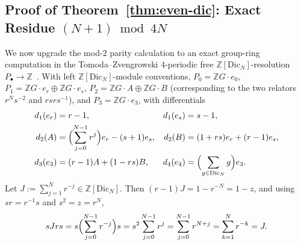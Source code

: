 \documentclass[11pt]{amsart}
\theoremstyle{definition}
\theoremstyle{remark}
\newcommand{\Z}{\mathbb{Z}}
\newcommand{\Dic}{\mathrm{Dic}}
\begin{document}
\subsection{Proof of Theorem~\ref{thm:even-dic}: Exact Residue $(N+1) \bmod 4N$}
We now upgrade the mod-$2$ parity calculation to an exact group-ring computation in the Tomoda--Zvengrowski $4$-periodic free $\Z[\Dic_N]$-resolution $P_\bullet \to \Z$~\cite[Props.~3.2--3.3]{TomodaZvengrowski2008}.
With left $\Z[\Dic_N]$-module conventions, $P_0 = \Z G\cdot e_0$, $P_1 = \Z G\cdot e_r \oplus \Z G\cdot e_s$, $P_2 = \Z G\cdot A \oplus \Z G\cdot B$ (corresponding to the two relators $r^N s^{-2}$ and $rsrs^{-1}$), and $P_3 = \Z G\cdot e_3$, with differentials
\begin{align*}
    d_1(e_r) &= r - 1, & d_1(e_s) &= s - 1, \\
    d_2(A) &= \Bigl(\sum_{j=0}^{N-1} r^j\Bigr)e_r - (s+1)e_s, & d_2(B) &= (1+rs)e_r + (r-1)e_s, \\
    d_3(e_3) &= (r-1)A + (1-rs)B, & d_4(e_4) &= \Bigl(\sum_{g\in \Dic_N} g\Bigr)e_3.
\end{align*}
Let $J := \sum_{j=1}^{N} r^{-j} \in \Z[\Dic_N]$.
Then $(r-1)J = 1 - r^{-N} = 1 - z$, and using $sr = r^{-1}s$ and $s^2 = z = r^N$,
\[
    sJrs = s\Bigl(\sum_{j=0}^{N-1} r^{-j}\Bigr)s = s^2\sum_{j=0}^{N-1} r^j = \sum_{j=0}^{N-1} r^{N+j} = \sum_{k=1}^{N} r^{-k} = J.
\]
\end{document}
